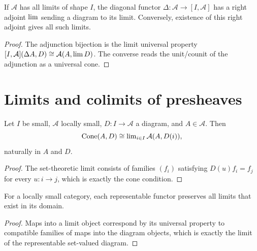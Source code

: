 \begin{proposition}
\label{prop:lbc-limit-right-adjoint}
If $\mathcal A$ has all limits of shape $I$, the diagonal functor
$\Delta:\mathcal A\to[ I,\mathcal A]$ has a right adjoint $\operatorname{lim}$ sending a diagram
to its limit. Conversely, existence of this right adjoint gives all such limits.
\end{proposition}
\begin{proof}
The adjunction bijection is the limit universal property
$[I,\mathcal A](\Delta A,D)\cong\mathcal A(A,\operatorname{lim} D)$. The converse reads the
unit/counit of the adjunction as a universal cone.
\end{proof}

\section{Limits and colimits of presheaves}
\begin{lemma}
\label{lem:lbc-pointwise-set-limit}
Let $I$ be small, $\mathcal A$ locally small, $D:I\to\mathcal A$ a diagram,
and $A\in\mathcal A$. Then
\[\operatorname{Cone}(A,D)\cong\operatorname{lim}_{i\in I}\mathcal A(A,D(i)),\]
naturally in $A$ and $D$.
\end{lemma}
\begin{proof}
The set-theoretic limit consists of families $(f_i)$ satisfying
$D(u)f_i=f_j$ for every $u:i\to j$, which is exactly the cone condition.
\end{proof}

\begin{proposition}
\label{prop:lbc-representables-preserve-limits}
For a locally small category, each representable functor preserves all limits
that exist in its domain.
\end{proposition}
\begin{proof}
Maps into a limit object correspond by its universal property to compatible
families of maps into the diagram objects, which is exactly the limit of the
representable set-valued diagram.
\end{proof}

